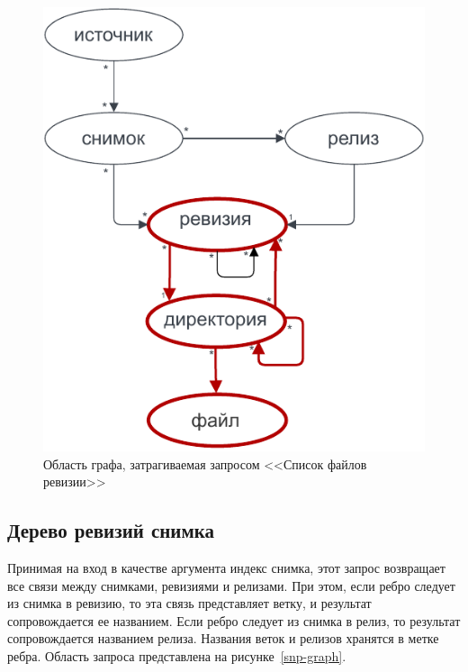 \documentclass[times,specification,annotation]{itmo-student-thesis}
\begin{document}
\begin{figure}[!h]
\caption{Область графа, затрагиваемая запросом <<Список файлов ревизии>>}\label{rec-graph}
\centering
\includegraphics{img/rec-graph.pdf}
\end{figure}

\subsection{Дерево ревизий снимка}

Принимая на вход в качестве аргумента индекс снимка, этот запрос возвращает все связи между снимками, ревизиями и релизами. При этом, если ребро следует из снимка в ревизию, то эта связь представляет ветку, и результат сопровождается ее названием. Если ребро следует из снимка в релиз, то результат сопровождается названием релиза. Названия веток и релизов хранятся в метке ребра. Область запроса представлена на рисунке~\ref{snp-graph}.
\end{document}
